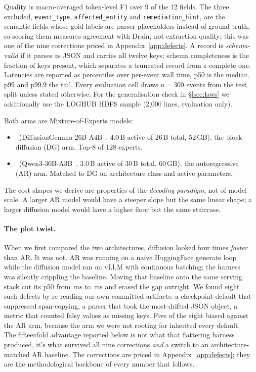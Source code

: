 Quality is macro-averaged token-level F1 over 9 of the 12 fields. The
three excluded, \texttt{event\_type}, \texttt{affected\_entity} and
\texttt{remediation\_hint}, are the semantic fields whose gold
labels are parser placeholders instead of ground truth, so scoring
them measures agreement with Drain, not extraction quality; this was
one of the nine corrections priced in Appendix~\ref{app:defects}.
A record is \emph{schema-valid} if it parses as JSON and carries all
twelve keys; schema completeness is the fraction of keys present, which
separates a truncated record from a complete one. Latencies are
reported as percentiles over per-event wall time, p50 is the median,
p99 and p99.9 the tail. Every evaluation cell draws $n = 300$ events
from the test split unless stated otherwise. For the generalisation check in \S\ref{sec:laws} we
additionally use the LOGHUB HDFS sample (2{,}000 lines, evaluation
only).

Both arms are Mixture-of-Experts models:
\begin{itemize}[nosep]
\item \DG\ (DiffusionGemma-26B-A4B~\cite{diffusiongemma}, 4.0\,B active
  of 26\,B total, 52\,GB), the block-diffusion (DG) arm. Top-8 of 128
  experts.
\item \ARthree\ (Qwen3-30B-A3B~\cite{qwen25}, 3.0\,B active of 30\,B
  total, 60\,GB), the autoregressive (AR) arm. Matched to DG on
  architecture class and active parameters.
\end{itemize}
The cost shapes we derive are properties of the \emph{decoding
paradigm}, not of model scale. A larger AR model would have a steeper
slope but the same linear shape; a larger diffusion model would have a
higher floor but the same staircase.

\paragraph{The plot twist.}

When we first compared the two architectures, diffusion looked four
times \emph{faster} than AR. It was not. AR was running on a
naive HuggingFace generate loop while the diffusion model ran on vLLM
with continuous batching; the harness was silently crippling the
baseline. Moving that baseline onto the same serving stack cut its p50
from \,ms to \,ms and erased the gap
outright. We found eight such defects by re-reading our own committed
artifacts: a checkpoint default that suppressed span-copying, a parser
that took the most-drifted JSON object, a metric that counted falsy
values as missing keys. Five of the eight biased against the AR arm,
because the arm we were not rooting for inherited every default. The
fifteenfold advantage reported below is not what that flattering
harness produced, it's what survived all nine corrections
\emph{and} a switch to an architecture-matched AR baseline. The
corrections are priced in Appendix~\ref{app:defects}; they are the
methodological backbone of every number that follows.

